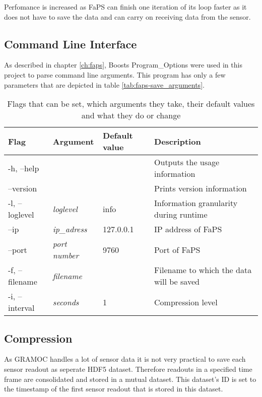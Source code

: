 Perfomance is increased as FaPS can finish one iteration of its loop faster as it does not have to save the data and can carry on receiving data from the sensor.

\subsection{Command Line Interface}

As described in chapter \vref{ch:faps}, Boosts Program\_Options were used in this project to parse command line arguments. This program has only a few parameters that are depicted in table \vref{tab:faps-save_arguments}.

\begin{table}[h]
    \centering
    \begin{tabular}{| l | l | l | p{5cm} |}
    \hline
    \textbf{Flag} & \textbf{Argument} & \textbf{Default value} & \textbf{Description} \\ \hline
    -h, --help & & & Outputs the usage information \\ \hline
    --version & & & Prints version information \\ \hline
    -l, --loglevel & \textit{loglevel} & info & Information granularity during runtime \\ \hline
    --ip & \textit{ip\_adress} & 127.0.0.1 & IP address of FaPS \\ \hline
    --port & \textit{port number} & 9760 & Port of FaPS \\ \hline
    -f, --filename & \textit{filename} & & Filename to which the data will be saved \\ \hline
    -i, --interval & \textit{seconds} & 1 & Compression level \\ \hline
    \end{tabular}
    \caption{Flags that can be set, which arguments they take, their default values and what they do or change}
    \label{tab:faps-save_arguments}
\end{table}

\subsection{Compression}

As GRAMOC handles a lot of sensor data it is not very practical to save each sensor readout as seperate HDF5 dataset. Therefore readouts in a specified time frame are consolidated and stored in a mutual dataset. This dataset's ID is set to the timestamp of the first sensor readout that is stored in this dataset.
